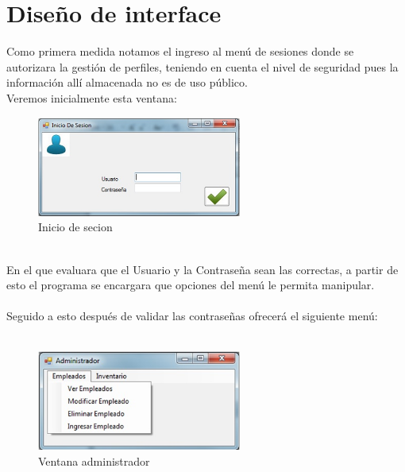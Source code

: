 \section{Dise\~no de interface}
Como primera medida notamos el ingreso al men\'u de sesiones donde se autorizara la gesti\'on de perfiles, teniendo en cuenta el nivel de seguridad pues la informaci\'on all\'i almacenada no es de uso p\'ublico.
\\%
Veremos inicialmente esta ventana:
\begin{figure}[htbp]
	\centering
		\includegraphics[width=0.60\textwidth]{images/Iniciosecion.jpg}
	\caption{Inicio de secion}
	\label{fig:Inicio de secion}
\end{figure}%
\\%
En el que evaluara que el Usuario y la Contrase\~na sean las correctas, a partir de esto el programa se encargara que opciones del men\'u le permita manipular.
\\%
\\%
Seguido a esto despu\'es de validar las contrase\~nas ofrecer\'a el siguiente men\'u:
\\%
\\%
%
\begin{figure}[htbp]
	\centering
		\includegraphics[width=0.60\textwidth]{images/Administrador.jpg}
	\caption{Ventana administrador}
	\label{fig:Ventana administrador}
\end{figure}%
